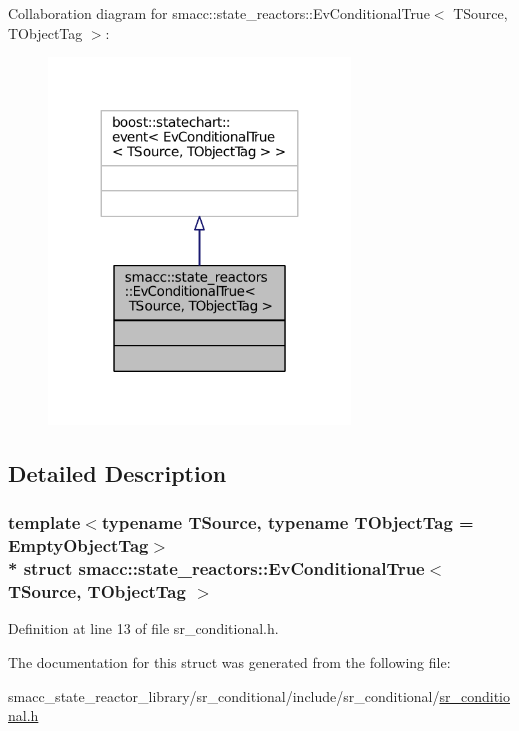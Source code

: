 Collaboration diagram for smacc\+:\+:state\+\_\+reactors\+:\+:Ev\+Conditional\+True$<$ T\+Source, T\+Object\+Tag $>$\+:
\nopagebreak
\begin{figure}[H]
\begin{center}
\leavevmode
\includegraphics[width=227pt]{structsmacc_1_1state__reactors_1_1EvConditionalTrue__coll__graph}
\end{center}
\end{figure}


\subsection{Detailed Description}
\subsubsection*{template$<$typename T\+Source, typename T\+Object\+Tag = Empty\+Object\+Tag$>$\\*
struct smacc\+::state\+\_\+reactors\+::\+Ev\+Conditional\+True$<$ T\+Source, T\+Object\+Tag $>$}



Definition at line 13 of file sr\+\_\+conditional.\+h.



The documentation for this struct was generated from the following file\+:\begin{DoxyCompactItemize}
\item 
smacc\+\_\+state\+\_\+reactor\+\_\+library/sr\+\_\+conditional/include/sr\+\_\+conditional/\hyperlink{sr__conditional_8h}{sr\+\_\+conditional.\+h}\end{DoxyCompactItemize}
